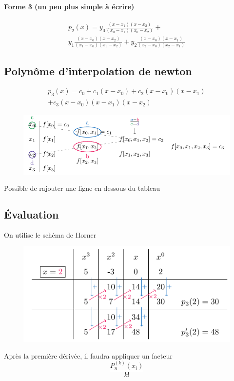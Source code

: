 \documentclass[resume]{subfiles}
\begin{document}
    \paragraph{Forme 3 (un peu plus simple à écrire)}
\begin{multline*}
p_2(x)=y_0\frac{(x-x_1)(x-x_2)}{(x_0-x_1)(x_0-x_2)}+\\y_1\frac{(x-x_0)(x-x_2)}{(x_1-x_0)(x_1-x_2)}+y_2\frac{(x-x_0)(x-x_1)}{(x_2-x_0)(x_2-x_1)}
\end{multline*}
    
    \subsection{Polynôme d'interpolation de newton}
    \begin{multline*}
    p_3(x)=c_0+c_1(x-x_0) +c_2(x-x_0)(x-x_1)\\ +c_3(x-x_0)(x-x_1)(x-x_2)
    \end{multline*}
    \begin{figure}[H]
        \centering
        \includegraphics[width=\columnwidth]{drwg_3.pdf}
    \end{figure}
    Possible de rajouter une ligne en dessous du tableau
    
    \subsection{Évaluation}
    On utilise le schéma de Horner
    \begin{figure}[H]
        \centering
        \includegraphics[width=0.8\columnwidth]{drwg_4.pdf}
    \end{figure}
    Après la première dérivée, il faudra appliquer un facteur
    $$\frac{P_n^{(k)}(x_i)}{k!}$$
\end{document}
